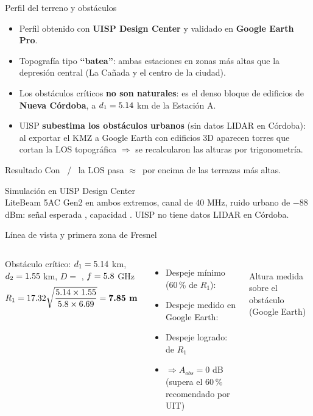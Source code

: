 \begin{frame}{Perfil del terreno y obstáculos}
  \begin{itemize}
    \item Perfil obtenido con \textbf{UISP Design Center} y validado en \textbf{Google Earth Pro}.
    \item Topografía tipo \textbf{``batea''}: ambas estaciones en zonas más altas que la depresión
          central (La Cañada y el centro de la ciudad).
    \item Los obstáculos críticos \textbf{no son naturales}: es el denso bloque de edificios de
          \textbf{Nueva Córdoba}, a $d_1=5.14$ km de la Estación A.
    \item UISP \textbf{subestima los obstáculos urbanos} (sin datos LIDAR en Córdoba):
          al exportar el KMZ a Google Earth con edificios 3D aparecen torres que cortan la LOS
          topográfica $\Rightarrow$ se recalcularon las alturas por trigonometría.
  \end{itemize}
  \begin{alertblock}{Resultado}
    Con \EBunoAlt\ / \EBdosAlt\ la LOS pasa $\approx$\EBdespeje\ por encima de las terrazas más altas.
  \end{alertblock}
\end{frame}

\begin{frame}{Simulación en UISP Design Center}
  \centering
  \\[4pt]
  \small LiteBeam 5AC Gen2 en ambos extremos, canal de 40 MHz, ruido urbano de $-88$ dBm:
  señal esperada \EBprxSim, capacidad \EBcapCanal. UISP no tiene datos LIDAR en Córdoba.
\end{frame}

\begin{frame}{Línea de vista y primera zona de Fresnel}
  \begin{columns}[c]
    \small
    Obstáculo crítico: $d_1=5.14$ km, $d_2=1.55$ km, $D=$ \EBdist, $f=5.8$ GHz
    \[
      R_1 = 17.32\sqrt{\frac{5.14\times1.55}{5.8\times 6.69}} = \textbf{7.85 m}
    \]
    \begin{itemize}
      \item Despeje mínimo (60\,\% de $R_1$): \textbf{\EBrSesenta}
      \item Despeje medido en Google Earth: \textbf{\EBdespeje}
      \item Despeje logrado: \textbf{\EBdespejePct} de $R_1$ \checkmark
      \item $\Rightarrow A_{obs} = 0$ dB (supera el 60\,\% recomendado por UIT)
    \end{itemize}
    \centering
    \\
    {\scriptsize Altura medida sobre el obstáculo (Google Earth)}
  \end{columns}
\end{frame}

